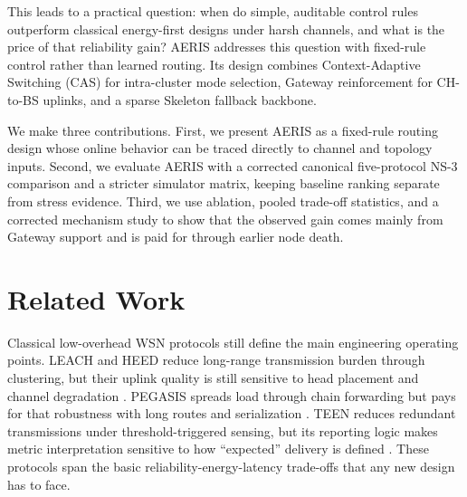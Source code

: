\documentclass[letterpaper,conference]{IEEEtran}
\begin{document}
This leads to a practical question: when do simple, auditable control rules outperform classical energy-first designs under harsh channels, and what is the price of that reliability gain? AERIS addresses this question with fixed-rule control rather than learned routing. Its design combines Context-Adaptive Switching (CAS) for intra-cluster mode selection, Gateway reinforcement for CH-to-BS uplinks, and a sparse Skeleton fallback backbone.

We make three contributions. First, we present AERIS as a fixed-rule routing design whose online behavior can be traced directly to channel and topology inputs. Second, we evaluate AERIS with a corrected canonical five-protocol NS-3 comparison and a stricter simulator matrix, keeping baseline ranking separate from stress evidence. Third, we use ablation, pooled trade-off statistics, and a corrected mechanism study to show that the observed gain comes mainly from Gateway support and is paid for through earlier node death.

\section{Related Work}
Classical low-overhead WSN protocols still define the main engineering operating points. LEACH and HEED reduce long-range transmission burden through clustering, but their uplink quality is still sensitive to head placement and channel degradation \cite{heinzelman2000leach,younis2004heed}. PEGASIS spreads load through chain forwarding but pays for that robustness with long routes and serialization \cite{lindsey2002pegasis}. TEEN reduces redundant transmissions under threshold-triggered sensing, but its reporting logic makes metric interpretation sensitive to how ``expected'' delivery is defined \cite{manjeshwar2001teen}. These protocols span the basic reliability-energy-latency trade-offs that any new design has to face.
\end{document}

